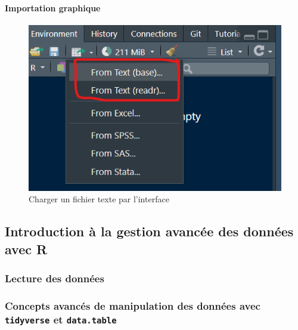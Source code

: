 \documentclass[
  letterpaper,
  DIV=11,
  numbers=noendperiod]{scrartcl}
\let\oldparagraph\paragraph
\renewcommand{\paragraph}[1]{\oldparagraph{#1}\mbox{}}
\begin{document}
\paragraph{Importation graphique}\label{importation-graphique}

\begin{figure}[H]

{\centering \includegraphics{images/importation_interface.png}

}

\caption{Charger un fichier texte par l'interface}

\end{figure}%

\subsection{Introduction à la gestion avancée des données avec
R}\label{introduction-uxe0-la-gestion-avancuxe9e-des-donnuxe9es-avec-r}

\subsubsection{Lecture des données}\label{lecture-des-donnuxe9es}

\subsubsection{\texorpdfstring{Concepts avancés de manipulation des
données avec \texttt{tidyverse} et
\texttt{data.table}}{Concepts avancés de manipulation des données avec tidyverse et data.table}}\label{concepts-avancuxe9s-de-manipulation-des-donnuxe9es-avec-tidyverse-et-data.table}
\end{document}
